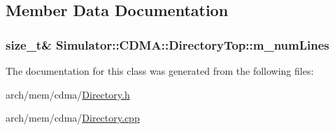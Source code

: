 \subsection{Member Data Documentation}
\hypertarget{class_simulator_1_1_c_d_m_a_1_1_directory_top_a4ebb4b89468d17f4984f9f4c44eb9cb1}{
\subsubsection[{m\+\_\+num\+Lines}]{\setlength{\rightskip}{0pt plus 5cm}size\+\_\+t\& Simulator\+::\+C\+D\+M\+A\+::\+Directory\+Top\+::m\+\_\+num\+Lines\hspace{0.3cm}{\ttfamily [protected]}}}\label{class_simulator_1_1_c_d_m_a_1_1_directory_top_a4ebb4b89468d17f4984f9f4c44eb9cb1}


The documentation for this class was generated from the following files\+:\begin{DoxyCompactItemize}
\item 
arch/mem/cdma/\hyperlink{cdma_2_directory_8h}{Directory.\+h}\item 
arch/mem/cdma/\hyperlink{cdma_2_directory_8cpp}{Directory.\+cpp}\end{DoxyCompactItemize}
